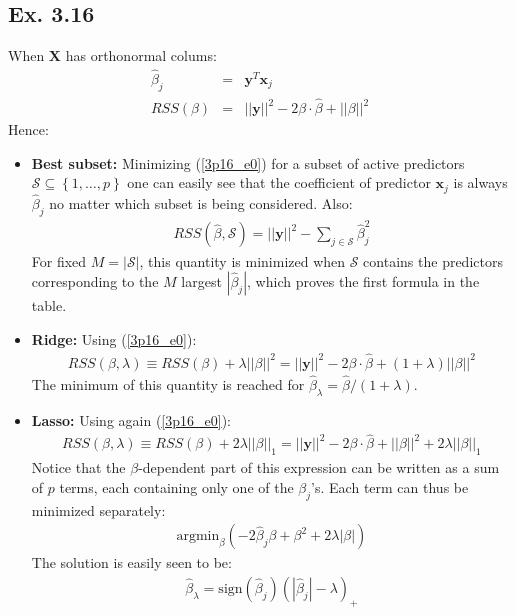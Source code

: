 \subsection*{Ex. 3.16}
When $\mathbf{X}$ has orthonormal colums:
\begin{eqnarray}
\hat{\beta}_j & = & \mathbf{y}^T \mathbf{x}_j \\
\label{3p16_e0}
RSS(\beta) & = & ||\mathbf{y}||^2 - 2 \beta \cdot \hat{\beta} + ||\beta||^2
\end{eqnarray}
Hence:
\begin{itemize}
\item \textbf{Best subset:} Minimizing (\ref{3p16_e0}) for a subset of active
predictors $\mathcal{S} \subseteq \left\{ 1, \ldots, p \right\}$ one can easily
see that the coefficient of predictor $\mathbf{x}_j$ is always $\hat{\beta}_j$
no matter which subset is being considered. Also:
\begin{eqnarray*}
RSS(\hat{\beta}, \mathcal{S}) = ||\mathbf{y}||^2 - \sum_{j \in \mathcal{S}} \hat{\beta}_j^2
\end{eqnarray*}
For fixed $M = |\mathcal{S}|$, this quantity is minimized when $\mathcal{S}$ contains
the predictors corresponding to the $M$ largest $|\hat{\beta}_j|$, which proves
the first formula in the table.
\item \textbf{Ridge:} Using (\ref{3p16_e0}):
\begin{eqnarray*}
RSS(\beta, \lambda) \equiv RSS(\beta) + \lambda ||\beta||^2 = ||\mathbf{y}||^2 - 2 \beta \cdot \hat{\beta} + \left( 1 + \lambda \right)||\beta||^2
\end{eqnarray*}
The minimum of this quantity is reached for $\hat{\beta}_{\lambda} = \hat{\beta} / (1 + \lambda)$.
\item \textbf{Lasso: } Using again (\ref{3p16_e0}):
\begin{eqnarray*}
RSS(\beta, \lambda) \equiv RSS(\beta) + 2 \lambda ||\beta||_1 = ||\mathbf{y}||^2 - 2 \beta \cdot \hat{\beta} + ||\beta||^2 + 2 \lambda ||\beta||_1
\end{eqnarray*}
Notice that the $\beta$-dependent part of this expression can be written as a sum
of $p$ terms, each containing only one of the $\beta_j$'s. Each term can thus be
minimized separately:
\begin{eqnarray*}
\textrm{argmin}_\beta \left( - 2 \hat{\beta}_j \beta + \beta^2 + 2 \lambda |\beta|   \right)
\end{eqnarray*}
The solution is easily seen to be:
\begin{eqnarray*}
\hat{\beta}_\lambda = \textrm{sign}(\hat{\beta}_j) \left( |\hat{\beta}_j| - \lambda \right)_+
\end{eqnarray*}
\end{itemize}

